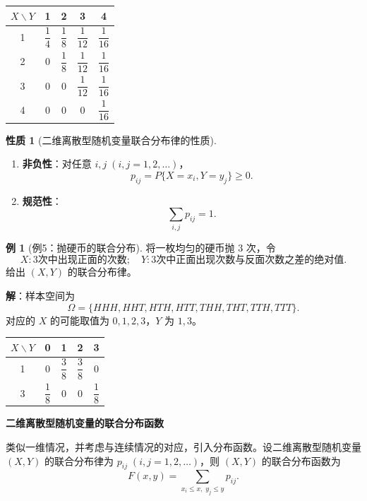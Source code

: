 \documentclass[11pt,a4paper]{report}
\theoremstyle{definition}
\newtheorem{example}{例}[chapter]
\newtheorem{property}{性质}[chapter]
\begin{document}
\begin{table}[htbp]
\centering
\begin{tabular}{@{}ccccc@{}}
\toprule
$X\backslash Y$ & 1 & 2 & 3 & 4 \\
\midrule
1 & $\dfrac{1}{4}$ & $\dfrac{1}{8}$ & $\dfrac{1}{12}$ & $\dfrac{1}{16}$ \\[0.5em]
2 & 0 & $\dfrac{1}{8}$ & $\dfrac{1}{12}$ & $\dfrac{1}{16}$ \\[0.5em]
3 & 0 & 0 & $\dfrac{1}{12}$ & $\dfrac{1}{16}$ \\[0.5em]
4 & 0 & 0 & 0 & $\dfrac{1}{16}$ \\[0.5em]
\bottomrule
\end{tabular}
\end{table}

\begin{property}[二维离散型随机变量联合分布律的性质]
\begin{enumerate}[label=(\arabic*),leftmargin=2em]
    \item \textbf{非负性}：对任意 $i,j\;(i,j=1,2,\dots)$，
    \[
    p_{ij}=P\{X=x_i,Y=y_j\}\geq 0.
    \]
    \item \textbf{规范性}：
    \[
    \sum_{i,j}p_{ij}=1.
    \]
\end{enumerate}
\end{property}

\begin{example}[例5：抛硬币的联合分布]
将一枚均匀的硬币抛 $3$ 次，令
\[
X:\text{3次中出现正面的次数};\quad Y:\text{3次中正面出现次数与反面次数之差的绝对值}.
\]
给出 $(X,Y)$ 的联合分布律。
\end{example}

\textbf{解}：样本空间为
\[
\Omega=\{HHH,HHT,HTH,HTT,THH,THT,TTH,TTT\}.
\]
对应的 $X$ 的可能取值为 $0,1,2,3$，$Y$ 为 $1,3$。

\begin{table}[htbp]
\centering
\begin{tabular}{@{}ccccc@{}}
\toprule
$X\backslash Y$ & 0 & 1 & 2 & 3 \\
\midrule
1 & 0 & $\dfrac{3}{8}$ & $\dfrac{3}{8}$ & 0 \\[0.5em]
3 & $\dfrac{1}{8}$ & 0 & 0 & $\dfrac{1}{8}$ \\[0.5em]
\bottomrule
\end{tabular}
\end{table}

\textbf{二维离散型随机变量的联合分布函数}

类似一维情况，并考虑与连续情况的对应，引入分布函数。设二维离散型随机变量 $(X,Y)$ 的联合分布律为 $p_{ij}\;(i,j=1,2,\dots)$，则 $(X,Y)$ 的联合分布函数为
\[
F(x,y)=\sum_{x_i\leq x,\;y_j\leq y}p_{ij}.
\]
\end{document}
